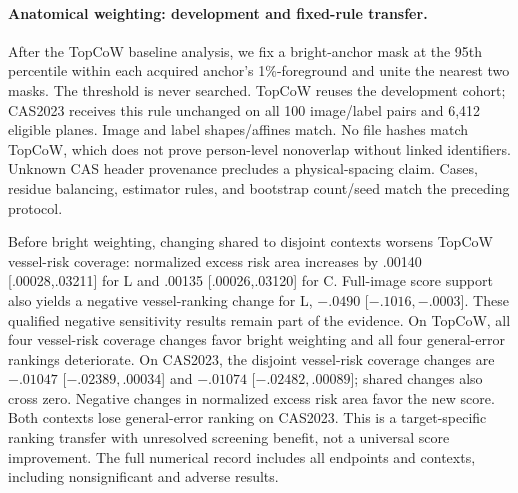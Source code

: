 \paragraph{Anatomical weighting: development and fixed-rule transfer.}
After the TopCoW baseline analysis, we fix a bright-anchor mask at the 95th percentile within each acquired anchor's 1\%-foreground and unite the nearest two masks. The threshold is never searched. TopCoW reuses the development cohort; CAS2023 receives this rule unchanged on all 100 image/label pairs and 6,412 eligible planes. Image and label shapes/affines match. No file hashes match TopCoW, which does not prove person-level nonoverlap without linked identifiers. Unknown CAS header provenance precludes a physical-spacing claim. Cases, residue balancing, estimator rules, and bootstrap count/seed match the preceding protocol.


Before bright weighting, changing shared to disjoint contexts worsens TopCoW vessel-risk coverage: normalized excess risk area increases by .00140 [.00028,.03211] for L and .00135 [.00026,.03120] for C. Full-image score support also yields a negative vessel-ranking change for L, $-.0490$ [$-.1016,-.0003$]. These qualified negative sensitivity results remain part of the evidence.
On TopCoW, all four vessel-risk coverage changes favor bright weighting and all four general-error rankings deteriorate. On CAS2023, the disjoint vessel-risk coverage changes are $-.01047$ [$-.02389,.00034$] and $-.01074$ [$-.02482,.00089$]; shared changes also cross zero. Negative changes in normalized excess risk area favor the new score. Both contexts lose general-error ranking on CAS2023. This is a target-specific ranking transfer with unresolved screening benefit, not a universal score improvement. The full numerical record includes all endpoints and contexts, including nonsignificant and adverse results.
